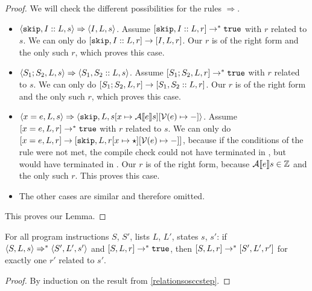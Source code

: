 \begin{proof}
We will check the different possibilities for the rules $\Rightarrow$. 
\begin{itemize}[noitemsep]
\item $\langle \texttt{skip}, I::L, s \rangle \Rightarrow \langle I, L, s \rangle$. Assume $[ \texttt{skip}, I::L, r ] \to ^{*} \texttt{true}$ with $r$ related to $s$. We can only do $[ \texttt{skip}, I::L, r ] \to  [ I, L, r ]$. Our $r$ is of the right form and the only such $r$, which proves this case. 

\item $\langle S_1; S_2, L, s \rangle \Rightarrow \langle S_1, S_2::L, s \rangle$. Assume $[ S_1; S_2, L, r ] \to ^{*} \texttt{true}$ with $r$ related to $s$. We can only do $[ S_1; S_2, L, r ] \to  [ S_1, S_2::L, r ]$. Our $r$ is of the right form and the only such $r$, which proves this case.

\item $\langle x = e, L, s \rangle \Rightarrow \langle \texttt{skip}, L, s[x \mapsto \mathcal{A} \llbracket e \rrbracket s][\mathcal{V}(e)\mapsto-] \rangle$. Assume $[ x = e, L, r ] \to ^{*} \texttt{true}$ with $r$ related to $s$. We can only do $[ x=e, L, r ] \to [ \texttt{skip}, L, r[x\mapsto \star][\mathcal{V}(e) \mapsto -] ]$, because if the conditions of the rule were not met, the compile check could not have terminated in \tr, but would have terminated in \fa. Our $r$ is of the right form, because $\mathcal{A} \llbracket e \rrbracket s \in \mathbb{Z}$ and the only such $r$. This proves this case.

\item The other cases are similar and therefore omitted. 
\end{itemize}
This proves our Lemma.
\end{proof}


\begin{lemma}
\label{relationsoscc}
For all program instructions $S$, $S'$, lists $L$, $L'$, states $s$, $s'$: if $\langle S, L, s \rangle \Rightarrow ^{*} \langle S', L', s' \rangle$ and $[ S, L, r ] \to ^{*} \texttt{true}$, then $[ S, L, r ] \to^{*} [ S', L', r' ]$ for exactly one $r'$ related to $s'$. 
\end{lemma}

\begin{proof}
By induction on the result from \ref{relationsosccstep}.
\end{proof}

